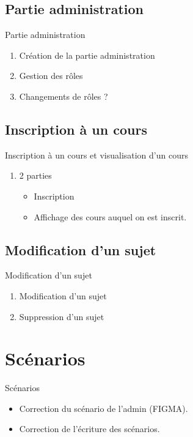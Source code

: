 \documentclass[numbering=fraction]{beamer}
\begin{document}
\subsection{Partie administration}
\begin{frame}{Partie administration}
    \begin{enumerate}
        \item Création de la partie administration
        \item Gestion des rôles
        \item Changements de rôles ?
    \end{enumerate}
\end{frame}
\subsection{Inscription à un cours}
\begin{frame}{Inscription à un cours et visualisation d'un cours}
    \begin{enumerate}
        \item 2 parties
        \begin{itemize}
            \item Inscription
            \item Affichage des cours auquel on est inscrit.
        \end{itemize}
    \end{enumerate}
\end{frame}
\subsection{Modification d'un sujet}
\begin{frame}{Modification d'un sujet}

    \begin{enumerate}
        \item Modification d'un sujet
        \item Suppression d'un sujet
    \end{enumerate}
\end{frame}
\section{Scénarios}
\begin{frame}{Scénarios}
    \begin{itemize}
        \item Correction du scénario de l'admin (FIGMA).
        \item Correction de l'écriture des scénarios.
    \end{itemize}
\end{frame}
\end{document}
